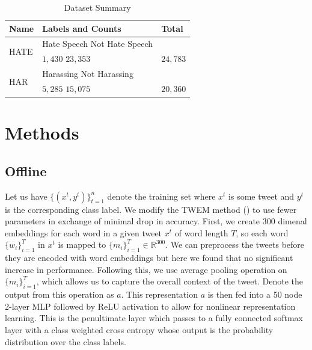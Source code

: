 \documentclass{article}
\begin{document}
  \begin{table}
    \caption{Dataset Summary}
    \label{datasets-table}
    \centering
    \begin{tabular}{lll}
      \toprule
      Name     & Labels and Counts     & Total \\
      \midrule
      \multirow{2}{*}{HATE} & Hate Speech \hspace{0.4cm} Not Hate Speech   &    \\
                             &  \hspace{0.2cm} \(1,430\) \hspace{2cm} \(23,353\) & $24,783$ \\
      \multirow{2}{*}{HAR} & Harassing \hspace{0.8cm} Not Harassing  &    \\
                             &  \hspace{0.2cm} $5,285$ \hspace{2cm} $15,075$ & $20,360$  \\
      \bottomrule
    \end{tabular}
  \end{table}

  \section{Methods}
  \subsection{Offline}
  Let us have \(\{(x^t, y^t)\}_{t=1}^n\) denote the training set where
  \(x^t\) is some tweet and \(y^t\) is the corresponding class label.
  We modify the TWEM method (\citet{kshirsagar2018predictive}) to use fewer parameters
  in exchange of minimal drop in accuracy. First, we create 300 dimenal embeddings for
  each word in a given tweet \(x^t\) of word length \(T\), so each word \(\{w_i\}_{i=1}^T\) in \(x^t\) is mapped to \(\{m_i\}_{i=1}^{T}\in \mathbb{R}^{300}\).
  We can preprocess the tweets before they are encoded with word embeddings but here we found that no significant increase in
  performance.
  Following this, we use average pooling operation on \(\{m_i\}_{i=1}^T\), which allows us to capture the overall
  context of the tweet. Denote the output from this operation as \(a\). This representation \(a\) is then fed
  into a 50 node 2-layer MLP followed by ReLU activation to allow for nonlinear representation learning.
  This is the penultimate layer which passes to a fully connected softmax layer with a class weighted cross entropy whose output is the probability
  distribution over the class labels.
\end{document}
